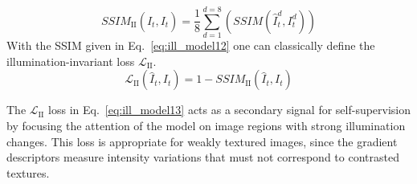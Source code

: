 \documentclass[a4paper,fleqn]{cas-dc}
\begin{document}
{%
\begin{equation} \label{eq:ill_model12}
SSIM_{\textrm{II}}\left(\hat{I}_{t}, I_t\right) = \frac{1}{8}\sum\limits_{d=1}^{d=8}\left(SSIM\left(\hat{I}_{t}^{d},I_{t}^{d}\right)\right)
\end{equation}
%
With the SSIM given in Eq.~\eqref{eq:ill_model12} one can classically define the illumination-invariant loss $\mathcal{L}_{\textrm{II}}$.
%
\begin{equation} \label{eq:ill_model13}
\mathcal{L}_{\textrm{II}}\left(\hat{I}_t, I_t\right) = 1 - SSIM_{\textrm{II}}\left(\hat{I}_t, I_t\right)
\end{equation}
%

The $\mathcal{L}_{\textrm{II}}$ loss in Eq.~\eqref{eq:ill_model13} acts as a secondary signal for self-supervision by focusing the attention of the model on image regions with strong illumination changes. This loss is appropriate for weakly textured images, since the gradient descriptors measure intensity variations that must not correspond to contrasted textures.

}
\end{document}
